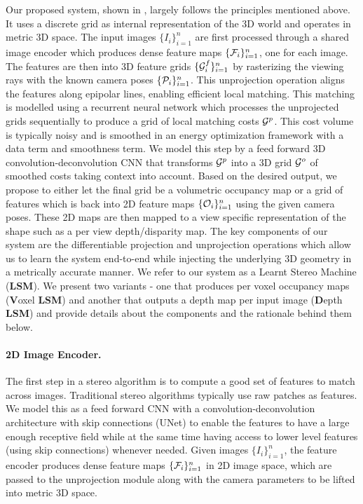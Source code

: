 \documentclass[../thesis.tex]{subfiles}
\begin{document}
Our proposed system, shown in , largely follows the principles mentioned above. It uses a discrete grid as internal representation of the 3D world and operates in metric 3D space. The input images $\{I_i\}_{i=1}^n$  are first processed through a shared image encoder which produces dense feature maps $\{\mathcal{F}_i\}_{i=1}^n$, one for each image. The features are then  into 3D feature grids $\{\mathcal{G}^{f}_i\}_{i=1}^n$ by rasterizing the viewing rays with the known camera poses $\{\mathcal{P}_i\}_{i=1}^n$. This unprojection operation aligns the features along epipolar lines, enabling efficient local matching. This matching is modelled using a recurrent neural network which processes the unprojected grids sequentially to produce a grid of local matching costs $\mathcal{G}^p$. This cost volume is typically noisy and is smoothed in an energy optimization framework with a data term and smoothness term. We model this step by a feed forward 3D convolution-deconvolution CNN that transforms $\mathcal{G}^p$ into a 3D grid $\mathcal{G}^o$ of smoothed costs taking context into account. Based on the desired output, we propose to either let the final grid be a volumetric occupancy map or a grid of features which is  back into 2D feature maps $\{\mathcal{O}_i\}_{i=1}^n$ using the given camera poses. These 2D maps are then mapped to a view specific representation of the shape such as a per view depth/disparity map. The key components of our system are the differentiable projection and unprojection operations which allow us to learn the system end-to-end while injecting the underlying 3D geometry in a metrically accurate manner. We refer to our system as a Learnt Stereo Machine (\textbf{LSM}). We present two variants - one that produces per voxel occupancy maps (\textbf{V}oxel \textbf{LSM}) and another that outputs a depth map per input image (\textbf{D}epth \textbf{LSM}) and provide details about the components and the rationale behind them below.

\paragraph{2D Image Encoder.}
The first step in a stereo algorithm is to compute a good set of features to match across images. Traditional stereo algorithms typically use raw patches as features. We model this as a feed forward CNN with a convolution-deconvolution architecture with skip connections (UNet) \cite{unet_2015} to enable the features to have a large enough receptive field while at the same time having access to lower level features (using skip connections) whenever needed. Given images $\{I_i\}_{i=1}^n$, the feature encoder produces dense feature maps $\{\mathcal{F}_i\}_{i=1}^n$ in 2D image space, which are passed to the unprojection module along with the camera parameters to be lifted into metric 3D space.
\end{document}
